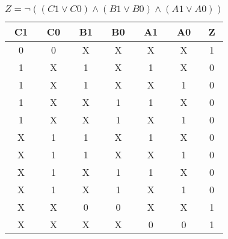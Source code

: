 
\begin{center}
    \begin{table}[h] \caption{\(Z = \lnot ((C1 \lor C0) \land (B1 \lor B0) \land (A1 \lor A0)) \)}
        \begin{center}
            \begin{tabular}{|c|c|c|c|c|c||c|} \hline
            C1 & C0 & B1 & B0 & A1 & A0 & Z \\ \hline\hline
            0  & 0  & X  & X  & X  & X  & 1 \\ \hline
            1  & X  & 1  & X  & 1  & X  & 0 \\ \hline
            1  & X  & 1  & X  & X  & 1  & 0 \\ \hline
            1  & X  & X  & 1  & 1  & X  & 0 \\ \hline
            1  & X  & X  & 1  & X  & 1  & 0 \\ \hline
            X  & 1  & 1  & X  & 1  & X  & 0 \\ \hline
            X  & 1  & 1  & X  & X  & 1  & 0 \\ \hline
            X  & 1  & X  & 1  & 1  & X  & 0 \\ \hline
            X  & 1  & X  & 1  & X  & 1  & 0 \\ \hline
            X  & X  & 0  & 0  & X  & X  & 1 \\ \hline
            X  & X  & X  & X  & 0  & 0  & 1 \\ \hline
            \end{tabular}
        \end{center}
    \end{table}
\end{center}
